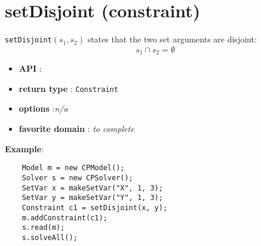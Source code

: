 \label{setdisjoint}
\hypertarget{setdisjoint}{}

\section{setDisjoint (constraint)}\label{setdisjoint:setdisjointconstraint}\hypertarget{setdisjoint:setdisjointconstraint}{}
\begin{notedef}
  \texttt{setDisjoint}$(s_1,s_2)$ states that the two set arguments are disjoint:
$$s_1\cap s_2=\emptyset$$
\end{notedef}

\begin{itemize}
	\item \textbf{API} : 
	\item \textbf{return type} : \texttt{Constraint}
	\item \textbf{options} :\emph{n/a}
	\item \textbf{favorite domain} : \emph{to complete}
\end{itemize}

\textbf{Example}:
\begin{lstlisting}
	Model m = new CPModel();
	Solver s = new CPSolver();
	SetVar x = makeSetVar("X", 1, 3);
	SetVar y = makeSetVar("Y", 1, 3);
	Constraint c1 = setDisjoint(x, y);
	m.addConstraint(c1);
	s.read(m);
	s.solveAll();
\end{lstlisting} 
